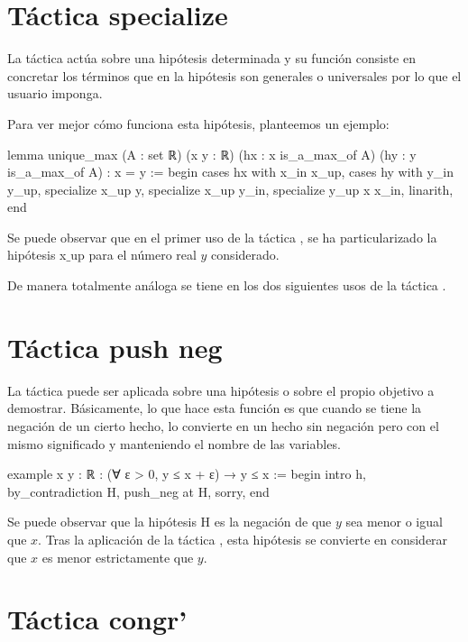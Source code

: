 \section{Táctica specialize}

La táctica  actúa sobre una hipótesis
determinada y su función consiste en concretar los términos que en la hipótesis
son generales o universales por lo que el usuario imponga.

Para ver mejor cómo funciona esta hipótesis, planteemos un ejemplo:
\begin{leancode}
lemma unique_max
(A : set ℝ)
(x y : ℝ)
(hx : x is_a_max_of A)
(hy : y is_a_max_of A) : 
x = y :=
begin
  cases hx with x_in x_up,
  cases hy with y_in y_up,
  specialize x_up y,
  specialize x_up y_in,
  specialize y_up x x_in,
  linarith,
end
\end{leancode}

Se puede observar que en el primer uso de la táctica
, se ha particularizado la hipótesis x\(\_\)up
para el número real \(y\) considerado.

De manera totalmente análoga se tiene en los dos siguientes usos de la táctica
.



\section{Táctica push neg}

La táctica  puede ser aplicada sobre una hipótesis
o sobre el propio objetivo a demostrar. Básicamente, lo que hace esta función es
que cuando se tiene la negación de un cierto hecho, lo convierte en un hecho
sin negación pero con el mismo significado y manteniendo el nombre de las
variables.

\begin{leancode}
example {x y : ℝ} : (∀ ε > 0, y ≤ x + ε) →  y ≤ x :=
begin
  intro h,
  by_contradiction H,
  push_neg at H,
  sorry,
end
\end{leancode}

Se puede observar que la hipótesis H es la negación de que \(y\) sea menor o
igual que \(x\). Tras la aplicación de la táctica ,
esta hipótesis se convierte en considerar que \(x\) es menor estrictamente que
\(y\). 

\section{Táctica congr'}

